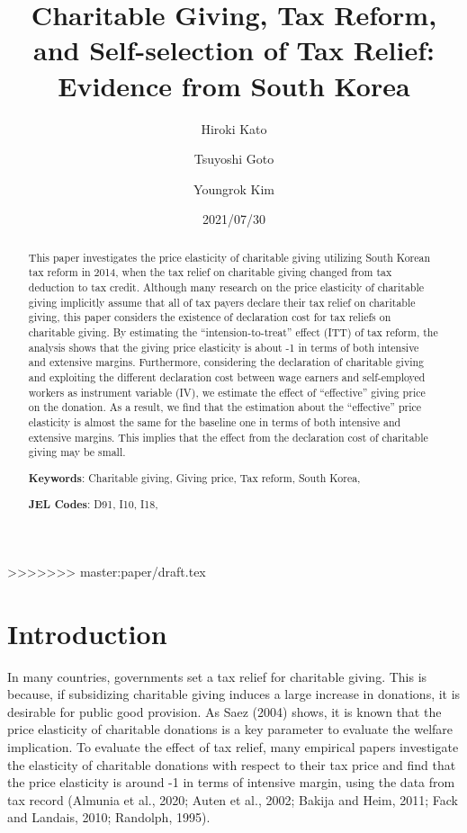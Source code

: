 \documentclass[
  11pt,
  a4paper,
]{article}
\title{Charitable Giving, Tax Reform, and Self-selection of Tax Relief: Evidence from South Korea}
\author[]{Hiroki Kato}
\affil{Graduate School of Economics, Osaka University, Japan \thanks{vge008kh@stundent.econ.osaka-u.ac.jp}}
\author[]{Tsuyoshi Goto}
\affil{Graduate School of Social Sciences, Chiba University, Japan}
\author[]{Youngrok Kim}
\affil{Graduate School of Economics, Kobe University, Japan}
\date{2021/07/30}
\begin{document}
\begin{spacing}{1}
  \maketitle
\end{spacing}
\begin{spacing}{1}
  \begin{abstract}
    This paper investigates the price elasticity of charitable giving utilizing South Korean tax reform in 2014, when the tax relief on charitable giving changed from tax deduction to tax credit. Although many research on the price elasticity of charitable giving implicitly assume that all of tax payers declare their tax relief on charitable giving, this paper considers the existence of declaration cost for tax reliefs on charitable giving.
    By estimating the ``intension-to-treat'' effect (ITT) of tax reform, the analysis shows that the giving price elasticity is about -1 in terms of both intensive and extensive margins. Furthermore, considering the declaration of charitable giving and exploiting the different declaration cost between wage earners and self-employed workers as instrument variable (IV), we estimate the effect of ``effective'' giving price on the donation. As a result, we find that the estimation about the ``effective'' price elasticity is almost the same for the baseline one in terms of both intensive and extensive margins. This implies that the effect from the declaration cost of charitable giving may be small.
    
            \noindent
    \textbf{Keywords}: Charitable giving, Giving price, Tax reform, South Korea, 
        
        \noindent
    \textbf{JEL Codes}: D91, I10, I18, 
        
  \end{abstract}
\end{spacing}
>>>>>>> master:paper/draft.tex

\hypertarget{introduction}{%
\section{Introduction}\label{introduction}}

In many countries, governments set a tax relief for charitable giving. This is because, if subsidizing charitable giving induces a large increase in donations, it is desirable for public good provision. As Saez (2004) shows, it is known that the price elasticity of charitable donations is a key parameter to evaluate the welfare implication. To evaluate the effect of tax relief, many empirical papers investigate the elasticity of charitable donations with respect to their tax price and find that the price elasticity is around -1 in terms of intensive margin, using the data from tax record (Almunia et al., 2020; Auten et al., 2002; Bakija and Heim, 2011; Fack and Landais, 2010; Randolph, 1995).
\end{document}
